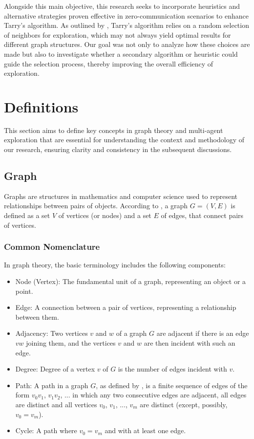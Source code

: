 Alongside this main objective, this research seeks to incorporate heuristics and alternative strategies proven effective in zero-communication scenarios to enhance Tarry's algorithm. As outlined by , Tarry's algorithm relies on a random selection of neighbors for exploration, which may not always yield optimal results for different graph structures. Our goal was not only to analyze how these choices are made but also to investigate whether a secondary algorithm or heuristic could guide the selection process, thereby improving the overall efficiency of exploration.


\section{Definitions}
\label{section_intro_definitions}

This section aims to define key concepts in graph theory and
multi-agent exploration that are essential for understanding the context 
and methodology of our research, ensuring clarity and consistency in the subsequent discussions.

\subsection{Graph}
\label{section_definitions_graph}

Graphs are structures in mathematics and computer science used to represent
relationships between pairs of objects. According to , a graph
$G=(V,E)$ is defined as a set $V$ of vertices (or nodes) and a set $E$ of edges,
that connect pairs of vertices. 

\subsubsection{Common Nomenclature}

In graph theory, the basic terminology includes the following components:

\begin{itemize}
    \item Node (Vertex): The fundamental unit of a graph, representing an object or a point.
    \item Edge: A connection between a pair of vertices, representing a relationship between them.
    \item Adjacency: Two vertices $v$ and $w$ of a graph $G$ are adjacent if there is an edge $vw$ joining them, and the vertices $v$ and $w$ are then incident with such an edge. \cite{West2018}
    \item Degree: Degree of a vertex $v$ of $G$ is the number of edges incident with $v$. \cite{West2018}
    \item Path: A path in a graph $G$, as defined by , is a finite sequence of edges of the form $v_0v_1$, $v_1v_2$, ... in which any two consecutive edges are adjacent, all edges are distinct and all vertices $v_0$, $v_1$, ..., $v_m$ are distinct (except, possibly, $v_0 = v_m$).
    \item Cycle: A path where $v_0 = v_m$ and with at least one edge. \cite{West2018}
\end{itemize}

